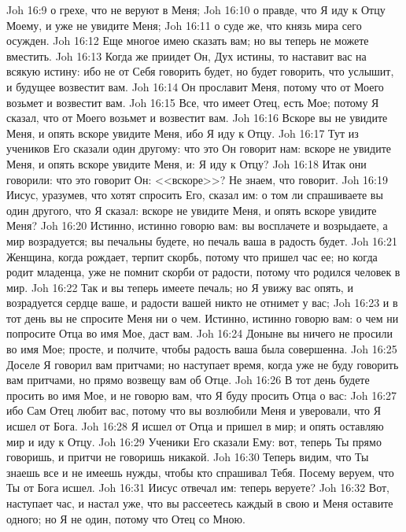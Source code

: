 \vs Joh 16:9 о грехе, что не веруют в Меня;
\vs Joh 16:10 о правде, что Я иду к Отцу Моему, и уже не увидите Меня;
\vs Joh 16:11 о суде же, что князь мира сего осужден.
\vs Joh 16:12 Еще многое имею сказать вам; но вы теперь не можете вместить.
\vs Joh 16:13 Когда же приидет Он, Дух истины, то наставит вас на всякую истину: ибо не от Себя говорить будет, но будет говорить, что услышит, и будущее возвестит вам.
\vs Joh 16:14 Он прославит Меня, потому что от Моего возьмет и возвестит вам.
\vs Joh 16:15 Все, что имеет Отец, есть Мое; потому Я сказал, что от Моего возьмет и возвестит вам.
\vs Joh 16:16 Вскоре вы не увидите Меня, и опять вскоре увидите Меня, ибо Я иду к Отцу.
\vs Joh 16:17 Тут  из учеников Его сказали один другому: что это Он говорит нам: вскоре не увидите Меня, и опять вскоре увидите Меня, и: Я иду к Отцу?
\vs Joh 16:18 Итак они говорили: что это говорит Он: <<вскоре>>? Не знаем, что говорит.
\vs Joh 16:19 Иисус, уразумев, что хотят спросить Его, сказал им: о том ли спрашиваете вы один другого, что Я сказал: вскоре не увидите Меня, и опять вскоре увидите Меня?
\vs Joh 16:20 Истинно, истинно говорю вам: вы восплачете и возрыдаете, а мир возрадуется; вы печальны будете, но печаль ваша в радость будет.
\vs Joh 16:21 Женщина, когда рождает, терпит скорбь, потому что пришел час ее; но когда родит младенца, уже не помнит скорби от радости, потому что родился человек в мир.
\vs Joh 16:22 Так и вы теперь имеете печаль; но Я увижу вас опять, и возрадуется сердце ваше, и радости вашей никто не отнимет у вас;
\vs Joh 16:23 и в тот день вы не спросите Меня ни о чем. Истинно, истинно говорю вам: о чем ни попросите Отца во имя Мое, даст вам.
\vs Joh 16:24 Доныне вы ничего не просили во имя Мое; просте, и полчите, чтобы радость ваша была совершенна.
\vs Joh 16:25 Доселе Я говорил вам притчами; но наступает время, когда уже не буду говорить вам притчами, но прямо возвещу вам об Отце.
\vs Joh 16:26 В тот день будете просить во имя Мое, и не говорю вам, что Я буду просить Отца о вас:
\vs Joh 16:27 ибо Сам Отец любит вас, потому что вы возлюбили Меня и уверовали, что Я исшел от Бога.
\vs Joh 16:28 Я исшел от Отца и пришел в мир; и опять оставляю мир и иду к Отцу.
\vs Joh 16:29 Ученики Его сказали Ему: вот, теперь Ты прямо говоришь, и притчи не говоришь никакой.
\vs Joh 16:30 Теперь видим, что Ты знаешь все и не имеешь нужды, чтобы кто спрашивал Тебя. Посему веруем, что Ты от Бога исшел.
\vs Joh 16:31 Иисус отвечал им: теперь веруете?
\vs Joh 16:32 Вот, наступает час, и настал уже, что вы рассеетесь каждый в свою  и Меня оставите одного; но Я не один, потому что Отец со Мною.
